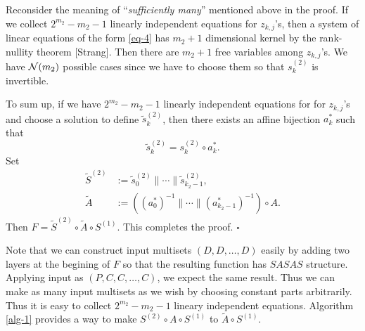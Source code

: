 \documentclass{ieeeaccess}
\begin{document}
Reconsider the meaning of ``{\it sufficiently many}'' mentioned  above in the proof.
If we collect $2^{m_2}-m_2-1$ linearly independent equations for $z_{k,j}$'s,
then a system of linear equations of the form \eqref{eq-4}
has $m_2+1$ dimensional kernel by the rank-nullity theorem [Strang].
Then there are $m_2+1$ free variables among $z_{k,j}$'s.
We have ${\cal N}(m_2)$ possible cases since we have to choose
them so that $s_k^{(2)}$ is invertible.

To sum up, if we have $2^{m_2}-m_2-1$ linearly independent equations for for $z_{k,j}$'s
and choose a solution to define $\tilde s_k^{(2)}$, then
there exists an affine bijection $a_k^*$ such that
\[
\tilde s_k^ {(2)} = s_k^{(2)} \circ a_k^*.
\]
Set 
\begin{align*}
\tilde S^{(2)} & := \tilde s_0^{(2)} \| \cdots \| \tilde s_{k_2-1}^{(2)}, \\
\tilde A &:= \left((a_0^*)^{-1} \| \cdots \| (a_{k_2-1}^*)^{-1}\right)\circ A.
\end{align*}
Then
$ F = {\tilde{S}^{(2)}} \circ \tilde A \circ S^{(1)}$.
This completes the proof. \hfill $\square$

Note that we can construct input multisets $(D,D,\ldots, D)$ easily
by adding two layers at the begining of $F$ so that
the resulting function has $SASAS$ structure.
Applying input as $(P, C, C,\ldots, C)$, we expect the same result.
Thus we can make as many input multisets as we wish 
by choosing constant parts arbitrarily.
Thus it is easy to collect $2^{m_2}-m_2-1$ lineary independent equations.
Algorithm \ref{alg-1} provides a way to make $S^{(2)}\circ A \circ S^{(1)}$ to
$\tilde A \circ S^{(1)}$.
\end{document}
